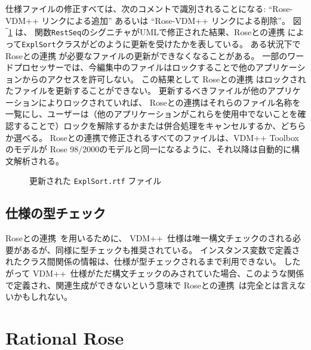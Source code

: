 \documentclass[\pformat,12pt]{jarticle}
\newcommand{\vdmpp}{VDM++}
\newcommand{\ToolboxName}{\vdmpp{} Toolbox}
\newcommand{\link}{Roseとの連携}
\newcommand{\rose}{Rose 98/2000}
\begin{document}
仕様ファイルの修正すべては、次のコメントで識別されることになる: ``Rose-VDM++ リンクによる追加'' あるいは ``Rose-VDM++ リンクによる削除''。
図‾\ref{fig:update} は、 関数{\tt  RestSeq}のシグニチャがUMLで修正された結果、\link{} によって{\tt ExplSort}クラスがどのように更新を受けたかを表している。
ある状況下で \link{} が必要なファイルの更新ができなくなることがある。
一部のワードプロセッサーでは、今編集中のファイルはロックすることで他のアプリケーションからのアクセスを許可しない。
この結果として \link{} はロックされたファイルを更新することができない。
更新するべきファイルが他のアプリケーションによりロックされていれば、 \link{}はそれらのファイル名称を一覧にし、ユーザーは（他のアプリケーションがこれらを使用中でないことを確認することで）ロックを解除するかまたは併合処理をキャンセルするか、どちらか選べる。
\link{}で修正されるすべてのファイルは、\ToolboxName{}のモデルが \rose{}のモデルと同一になるように、それ以降は自動的に構文解析される。

\begin{figure}[htb]
\begin{center}
\mbox{}
\caption{更新された {\tt ExplSort.rtf} ファイル　\label{fig:update}}
\end{center}
\end{figure}


\subsection{仕様の型チェック} \label{sec:typecheck}

 \link\ を用いるために、 \vdmpp\ 仕様は唯一構文チェックのされる必要があるが、同様に型チェックも推奨されている。
インスタンス変数で定義されたクラス間関係の情報は、仕様が型チェックされるまで利用できない。
したがって \vdmpp\ 仕様がただ構文チェックのみされていた場合、このような関係で定義され、関連生成ができないという意味で \link\ は完全とは言えないかもしれない。

\newpage  
\section{Rational Rose} \label{rose98}
  
\end{document}
